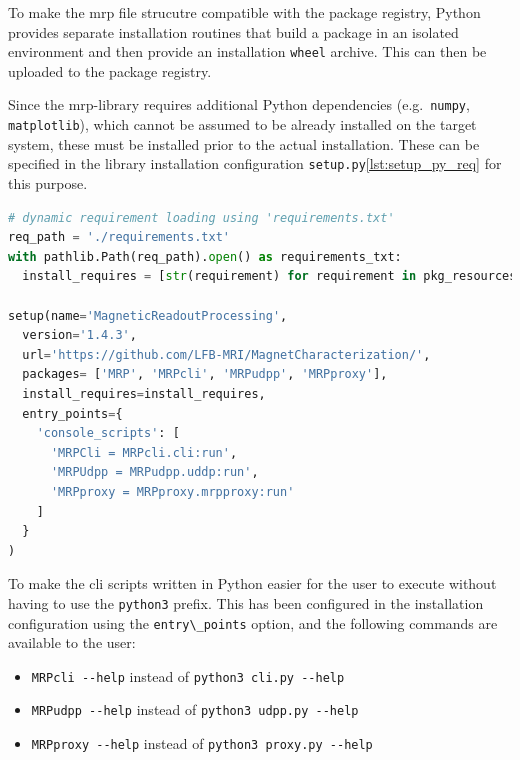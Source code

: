 To make the \gls{mrp} file strucutre compatible with the package
registry, Python provides separate installation routines that build a
package in an isolated environment and then provide an installation
\passthrough{\lstinline!wheel!} archive. This can then be uploaded to
the package registry.

Since the \gls{mrp}-library requires additional Python dependencies
(e.g.~\passthrough{\lstinline!numpy!},
\passthrough{\lstinline!matplotlib!}), which cannot be assumed to be
already installed on the target system, these must be installed prior to
the actual installation. These can be specified in the library
installation configuration
\passthrough{\lstinline!setup.py!}\ref{lst:setup_py_req} for this
purpose.

\begin{lstlisting}[language=Python, caption={setup.py with dynamic requirement parsing used given requirements.txt}, label=lst:setup_py_req]
# dynamic requirement loading using 'requirements.txt'
req_path = './requirements.txt'
with pathlib.Path(req_path).open() as requirements_txt:
  install_requires = [str(requirement) for requirement in pkg_resources.parse_requirements(requirements_txt)]

setup(name='MagneticReadoutProcessing',
  version='1.4.3',
  url='https://github.com/LFB-MRI/MagnetCharacterization/',
  packages= ['MRP', 'MRPcli', 'MRPudpp', 'MRPproxy'],
  install_requires=install_requires,
  entry_points={
    'console_scripts': [
      'MRPCli = MRPcli.cli:run',
      'MRPUdpp = MRPudpp.uddp:run',
      'MRPproxy = MRPproxy.mrpproxy:run'
    ]
  }
)
\end{lstlisting}

To make the \gls{cli} scripts written in Python easier for the user to
execute without having to use the \passthrough{\lstinline!python3!}
prefix. This has been configured in the installation configuration using
the \passthrough{\lstinline!entry\_points!} option, and the following
commands are available to the user:

\begin{itemize}
\tightlist
\item
  \passthrough{\lstinline!MRPcli --help!} instead of
  \passthrough{\lstinline!python3 cli.py --help!}
\item
  \passthrough{\lstinline!MRPudpp --help!} instead of
  \passthrough{\lstinline!python3 udpp.py --help!}
\item
  \passthrough{\lstinline!MRPproxy --help!} instead of
  \passthrough{\lstinline!python3 proxy.py --help!}
\end{itemize}

